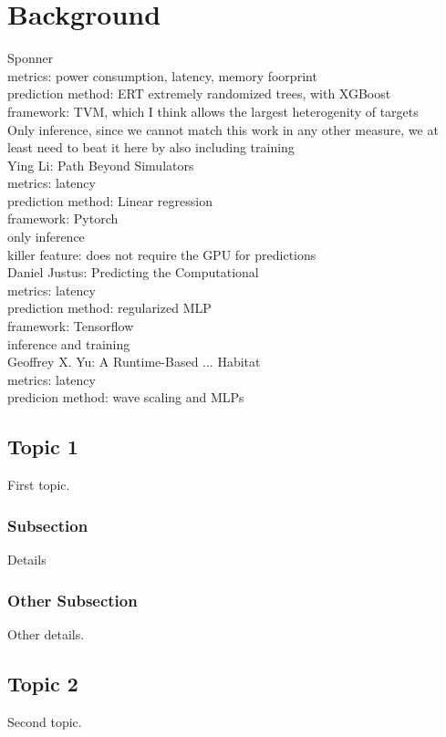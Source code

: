 \chapter{Background}\label{chap:background}

Sponner \\
metrics: power consumption, latency, memory foorprint \\
prediction method: ERT extremely randomized trees, with XGBoost \\
framework: TVM, which I think allows the largest heterogenity of targets \\
Only inference, since we cannot match this work in any other measure, we at least need to beat it here by also including training\\


Ying Li: Path Beyond Simulators \\
metrics: latency\\
prediction method: Linear regression\\
framework: Pytorch\\
only inference\\
killer feature: does not require the GPU for predictions\\

Daniel Justus: Predicting the Computational \\
metrics: latency\\
prediction method: regularized MLP\\
framework: Tensorflow\\
inference and training \\


Geoffrey X. Yu: A Runtime-Based ... Habitat \\
metrics: latency\\
predicion method: wave scaling and MLPs\\


\section{Topic 1}
First topic.

\subsection{Subsection}
Details

\subsection{Other Subsection}
Other details.

\section{Topic 2}
Second topic.
